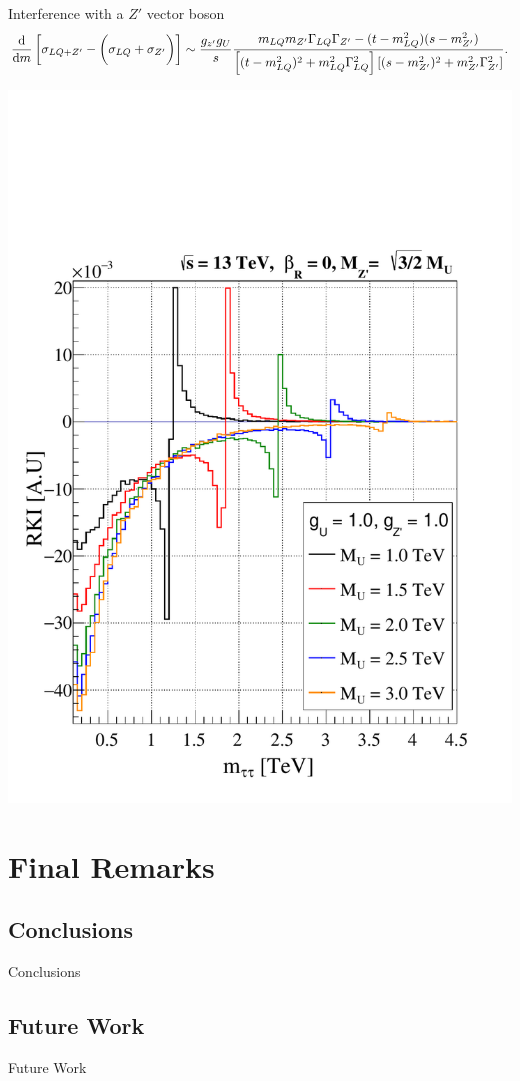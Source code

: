 \documentclass{../bredelebeamer}
\begin{document}
\begin{frame}{Interference with a $Z'$ vector boson}
	\begin{equation*}
					\dv{m}\left[
							\sigma_{ LQ+Z'}-\left(\sigma_{ LQ} +\sigma_{Z'}
							\vphantom{\frac{1}2}
							\right)
							\right]
							\sim \frac{g_{z'}g_{U}}{s}\frac{ m_{LQ}m_{Z'}\Gamma_{LQ}\Gamma_{Z'}- (t-m_{LQ}^2)(s-m_{Z'}^2)}{\left[
					(t-m_{LQ}^2)^2 + m_{LQ}^2\Gamma_{LQ}^2
			\right]
			\left[
					(s-m_{Z'}^2)^2 + m_{Z'}^2\Gamma_{Z'}^2
			\right]}.
	\end{equation*}

	\begin{center}
		\includegraphics[width=.48\linewidth]{../2023_paper/Kinematic_Interference_gu_1.0_gzp_1.0_zp_upper_limit_woRHC.pdf}
	\end{center}
		
	

\end{frame}
\section{Final Remarks}
\subsection{Conclusions}
\begin{frame}{Conclusions}

\end{frame}

\subsection{Future Work}
\begin{frame}{Future Work}

\end{frame}
\end{document}
